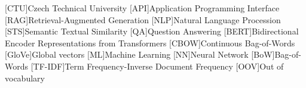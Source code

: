 
\begin{acronym}
  [CTU]{Czech Technical University}
  [API]{Application Programming Interface}
  [RAG]{Retrieval-Augmented Generation}
  [NLP]{Natural Language Procession}
  [STS]{Semantic Textual Similarity}
  [QA]{Question Answering}
  [BERT]{Bidirectional Encoder Representations from Transformers}
  [CBOW]{Continuous Bag-of-Words}
  [GloVe]{Global vectors}
  [ML]{Machine Learning}
  [NN]{Neural Network}
  [BoW]{Bag-of-Words}
  [TF-IDF]{Term Frequency-Inverse Document Frequency}
  [OOV]{Out of vocabulary}
\end{acronym}
